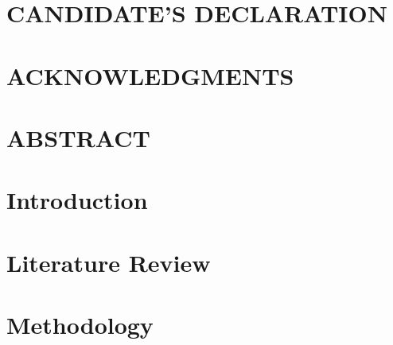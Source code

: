 \documentclass[12pt, a4paper]{report}
\begin{document}
\pagestyle{fancy}
\fancyhf{}%
\fancyfoot[R]{\thepage}






 
 
\chapter*{CANDIDATE'S DECLARATION}

\chapter*{ACKNOWLEDGMENTS}

\chapter*{ABSTRACT}

 \newpage


\renewcommand\bibname{REFERENCES}
\renewcommand*\contentsname{CONTENTS} 
\renewcommand*\listtablename{LIST OF TABLES} 
\renewcommand*\listfigurename{LIST OF FIGURES} 
\begin{center}
 \tableofcontents \newpage
 \listoffigures  \newpage
 \listoftables   \newpage
\end{center}



\cleardoublepage
{}

\chapter{Introduction}
\thispagestyle{custom}


\chapter{Literature Review}
\thispagestyle{custom}


\chapter{Methodology}
\thispagestyle{custom}

\end{document}
